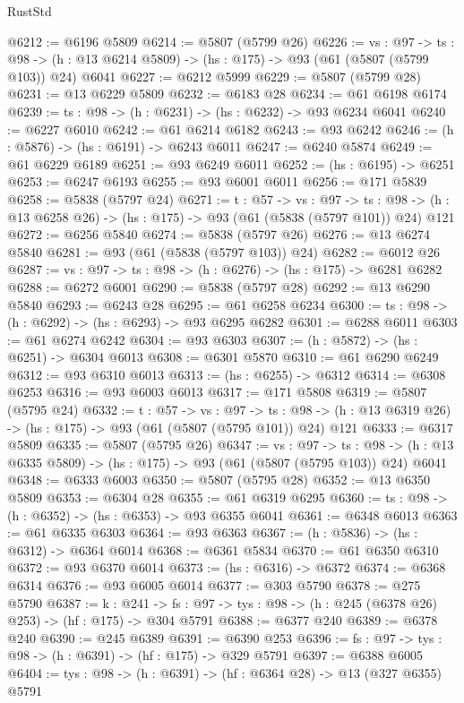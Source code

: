 \begin{lexlean}{RustStd}
\begin{coremodule}
@6212 := @6196 @5809
@6214 := @5807 (@5799 @26)
@6226 := {vs : @97} ->
  {ts : @98} -> (h : @13 @6214 @5809) -> (hs : @175) -> @93 (@61 (@5807 (@5799 @103)) @24) @6041
@6227 := @6212 @5999
@6229 := @5807 (@5799 @28)
@6231 := @13 @6229 @5809
@6232 := @6183 @28
@6234 := @61 @6198 @6174
@6239 := {ts : @98} -> (h : @6231) -> (hs : @6232) -> @93 @6234 @6041
@6240 := @6227 @6010
@6242 := @61 @6214 @6182
@6243 := @93 @6242
@6246 := (h : @5876) -> (hs : @6191) -> @6243 @6011
@6247 := @6240 @5874
@6249 := @61 @6229 @6189
@6251 := @93 @6249 @6011
@6252 := (hs : @6195) -> @6251
@6253 := @6247 @6193
@6255 := @93 @6001 @6011
@6256 := @171 @5839
@6258 := @5838 (@5797 @24)
@6271 := {t : @57} ->
  {vs : @97} ->
  {ts : @98} -> (h : @13 @6258 @26) -> (hs : @175) -> @93 (@61 (@5838 (@5797 @101)) @24) @121
@6272 := @6256 @5840
@6274 := @5838 (@5797 @26)
@6276 := @13 @6274 @5840
@6281 := @93 (@61 (@5838 (@5797 @103)) @24)
@6282 := @6012 @26
@6287 := {vs : @97} -> {ts : @98} -> (h : @6276) -> (hs : @175) -> @6281 @6282
@6288 := @6272 @6001
@6290 := @5838 (@5797 @28)
@6292 := @13 @6290 @5840
@6293 := @6243 @28
@6295 := @61 @6258 @6234
@6300 := {ts : @98} -> (h : @6292) -> (hs : @6293) -> @93 @6295 @6282
@6301 := @6288 @6011
@6303 := @61 @6274 @6242
@6304 := @93 @6303
@6307 := (h : @5872) -> (hs : @6251) -> @6304 @6013
@6308 := @6301 @5870
@6310 := @61 @6290 @6249
@6312 := @93 @6310 @6013
@6313 := (hs : @6255) -> @6312
@6314 := @6308 @6253
@6316 := @93 @6003 @6013
@6317 := @171 @5808
@6319 := @5807 (@5795 @24)
@6332 := {t : @57} ->
  {vs : @97} ->
  {ts : @98} -> (h : @13 @6319 @26) -> (hs : @175) -> @93 (@61 (@5807 (@5795 @101)) @24) @121
@6333 := @6317 @5809
@6335 := @5807 (@5795 @26)
@6347 := {vs : @97} ->
  {ts : @98} -> (h : @13 @6335 @5809) -> (hs : @175) -> @93 (@61 (@5807 (@5795 @103)) @24) @6041
@6348 := @6333 @6003
@6350 := @5807 (@5795 @28)
@6352 := @13 @6350 @5809
@6353 := @6304 @28
@6355 := @61 @6319 @6295
@6360 := {ts : @98} -> (h : @6352) -> (hs : @6353) -> @93 @6355 @6041
@6361 := @6348 @6013
@6363 := @61 @6335 @6303
@6364 := @93 @6363
@6367 := (h : @5836) -> (hs : @6312) -> @6364 @6014
@6368 := @6361 @5834
@6370 := @61 @6350 @6310
@6372 := @93 @6370 @6014
@6373 := (hs : @6316) -> @6372
@6374 := @6368 @6314
@6376 := @93 @6005 @6014
@6377 := @303 @5790
@6378 := @275 @5790
@6387 := {k : @241} ->
  {fs : @97} -> {tys : @98} -> (h : @245 (@6378 @26) @253) -> (hf : @175) -> @304 @5791
@6388 := @6377 @240
@6389 := @6378 @240
@6390 := @245 @6389
@6391 := @6390 @253
@6396 := {fs : @97} -> {tys : @98} -> (h : @6391) -> (hf : @175) -> @329 @5791
@6397 := @6388 @6005
@6404 := {tys : @98} -> (h : @6391) -> (hf : @6364 @28) -> @13 (@327 @6355) @5791

\end{coremodule}
\end{lexlean}
